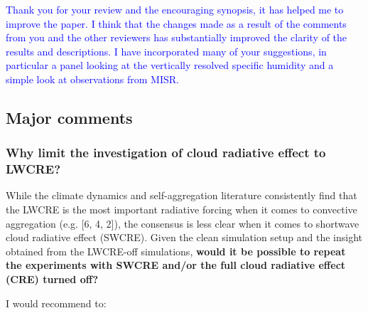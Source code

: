 \documentclass[draft]{agujournal2019}
\begin{document}
\textcolor{blue}{Thank you for your review and the encouraging synopsis, it has helped me to improve the paper.  I think that 
the changes made as a result of the comments from you and the other reviewers has substantially improved the clarity of the 
results and descriptions.  I have incorporated many of your suggestions, in particular a panel looking at the vertically resolved 
specific humidity and a simple look at observations from MISR.}

\subsection{Major comments}
\subsubsection{Why limit the investigation of cloud radiative effect to LWCRE?}
While the climate dynamics and self-aggregation literature consistently find that the LWCRE is the most important
radiative forcing when it comes to convective aggregation (e.g. [6, 4, 2]), the consensus is less clear when it comes to
shortwave cloud radiative effect (SWCRE). Given the clean simulation setup and the insight obtained from the LWCRE-off
simulations, \textbf{would it be possible to repeat the experiments with SWCRE and/or the full cloud radiative
effect (CRE) turned off?}

I would recommend to:
\end{document}

